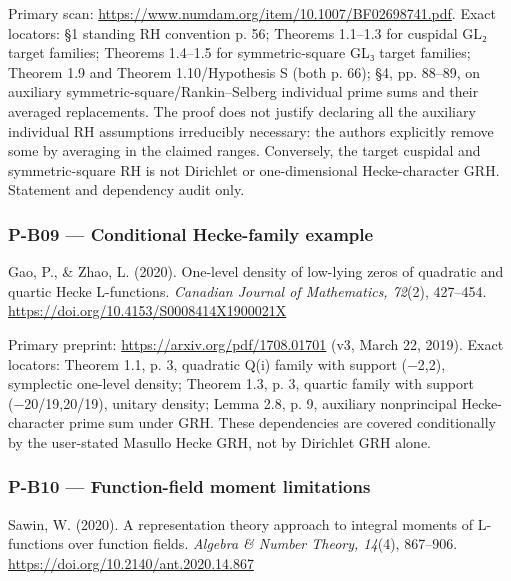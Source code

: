 \documentclass[11pt,a4paper]{article}
\theoremstyle{definition}\newtheorem{definition}{Definition}
\begin{document}
Primary scan: \url{https://www.numdam.org/item/10.1007/BF02698741.pdf}.
Exact locators: §1 standing RH convention p. 56; Theorems 1.1--1.3 for
cuspidal GL₂ target families; Theorems 1.4--1.5 for symmetric-square GL₃
target families; Theorem 1.9 and Theorem 1.10/Hypothesis S (both p. 66);
§4, pp. 88--89, on auxiliary symmetric-square/Rankin--Selberg individual
prime sums and their averaged replacements. The proof does not justify
declaring all the auxiliary individual RH assumptions irreducibly
necessary: the authors explicitly remove some by averaging in the
claimed ranges. Conversely, the target cuspidal and symmetric-square RH
is not Dirichlet or one-dimensional Hecke-character GRH. Statement and
dependency audit only.

\subsubsection{P-B09 --- Conditional Hecke-family
example}\label{p-b09--conditional-hecke-family-example}

Gao, P., \& Zhao, L. (2020). One-level density of low-lying zeros of
quadratic and quartic Hecke L-functions. \emph{Canadian Journal of
Mathematics, 72}(2), 427--454.
\url{https://doi.org/10.4153/S0008414X1900021X}

Primary preprint: \url{https://arxiv.org/pdf/1708.01701} (v3, March 22,
2019). Exact locators: Theorem 1.1, p. 3, quadratic Q(i) family with
support (−2,2), symplectic one-level density; Theorem 1.3, p. 3, quartic
family with support (−20/19,20/19), unitary density; Lemma 2.8, p. 9,
auxiliary nonprincipal Hecke-character prime sum under GRH. These
dependencies are covered conditionally by the user-stated Masullo Hecke
GRH, not by Dirichlet GRH alone.

\subsubsection{P-B10 --- Function-field moment
limitations}\label{p-b10--function-field-moment-limitations}

Sawin, W. (2020). A representation theory approach to integral moments
of L-functions over function fields. \emph{Algebra \& Number Theory,
14}(4), 867--906. \url{https://doi.org/10.2140/ant.2020.14.867}
\end{document}
